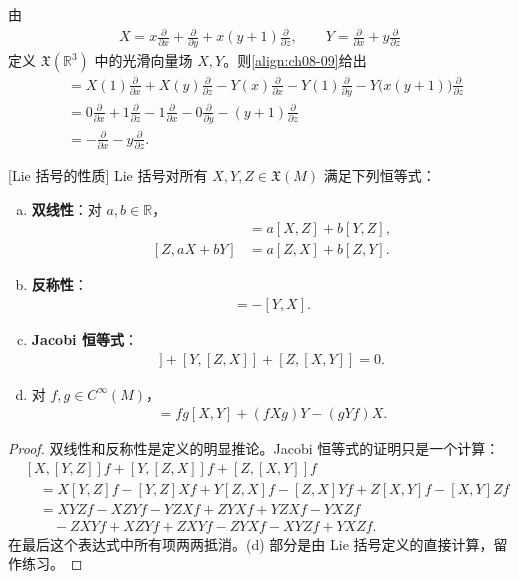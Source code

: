 \documentclass[../../main.tex]{subfiles}
\begin{document}
\begin{example}\label{example:ch08-27}
由
\begin{align*}
X=x\frac{\partial}{\partial x}+\frac{\partial}{\partial y}+x(y+1)\frac{\partial}{\partial z},\qquad
Y=\frac{\partial}{\partial x}+y\frac{\partial}{\partial z}
\end{align*}
定义 $\mathfrak{X}(\mathbb{R}^3)$ 中的光滑向量场 $X,Y$。则\eqref{align:ch08-09}给出
\begin{align*}
[X,Y]&=X(1)\frac{\partial}{\partial x}+X(y)\frac{\partial}{\partial z}-Y(x)\frac{\partial}{\partial x}-Y(1)\frac{\partial}{\partial y}-Y\bigl(x(y+1)\bigr)\frac{\partial}{\partial z}\\
&=0\frac{\partial}{\partial x}+1\frac{\partial}{\partial z}-1\frac{\partial}{\partial x}-0\frac{\partial}{\partial y}-(y+1)\frac{\partial}{\partial z}\\
&=-\frac{\partial}{\partial x}-y\frac{\partial}{\partial z}.
\end{align*}
\end{example}

\begin{proposition}\label{proposition:ch08-28}[Lie 括号的性质]
Lie 括号对所有 $X,Y,Z\in\mathfrak{X}(M)$ 满足下列恒等式：
\begin{enumerate}[(a)]
\item \textbf{双线性}：对 $a,b\in\mathbb{R}$，
\begin{align*}
[aX+bY,Z]&=a[X,Z]+b[Y,Z],\\
[Z,aX+bY]&=a[Z,X]+b[Z,Y].
\end{align*}
\item \textbf{反称性}：
\begin{align*}
[X,Y]=-[Y,X].
\end{align*}
\item \textbf{Jacobi 恒等式}：
\begin{align*}
[X,[Y,Z]]+[Y,[Z,X]]+[Z,[X,Y]]=0.
\end{align*}
\item 对 $f,g\in C^\infty(M)$，
\begin{align}
[fX,gY]=fg[X,Y]+(fXg)Y-(gYf)X.\label{align:ch08-11}
\end{align}
\end{enumerate}
\end{proposition}

\begin{proof}
双线性和反称性是定义的明显推论。Jacobi 恒等式的证明只是一个计算：
\begin{align*}
&[X,[Y,Z]]f+[Y,[Z,X]]f+[Z,[X,Y]]f\\
&\quad=X[Y,Z]f-[Y,Z]Xf+Y[Z,X]f-[Z,X]Yf+Z[X,Y]f-[X,Y]Zf\\
&\quad=XYZf-XZYf-YZXf+ZYXf+YZXf-YXZf\\
&\qquad-ZXYf+XZYf+ZXYf-ZYXf-XYZf+YXZf.
\end{align*}
在最后这个表达式中所有项两两抵消。(d) 部分是由 Lie 括号定义的直接计算，留作练习。
\end{proof}
\end{document}
